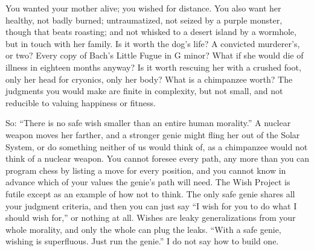 You wanted your mother alive; you wished for distance.  You also want her healthy, not badly burned; untraumatized, not seized by a purple monster, though that beats roasting; and not whisked to a desert island by a wormhole, but in touch with her family. Is it worth the dog's life? A convicted murderer's, or two? Every copy of Bach's Little Fugue in G minor? What if she would die of illness in eighteen months anyway? Is it worth rescuing her with a crushed foot, only her head for cryonics, only her body? What is a chimpanzee worth? The judgments you would make are finite in complexity, but not small, and not reducible to valuing happiness or fitness.

So: ``There is no safe wish smaller than an entire human morality.'' A nuclear weapon moves her farther, and a stronger genie might fling her out of the Solar System, or do something neither of us would think of, as a chimpanzee would not think of a nuclear weapon. You cannot foresee every path, any more than you can program chess by listing a move for every position, and you cannot know in advance which of your values the genie's path will need.  The Wish Project is futile except as an example of how not to think. The only safe genie shares all your judgment criteria, and then you can just say ``I wish for you to do what I should wish for,'' or nothing at all. Wishes are leaky generalizations from your whole morality, and only the whole can plug the leaks. ``With a safe genie, wishing is superfluous. Just run the genie.'' I do not say how to build one.

